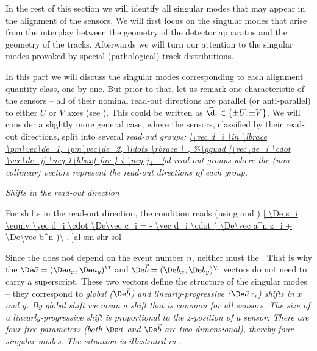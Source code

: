 In the rest of this section we will identify all singular modes that may appear in the alignment of the  sensors. We will first focus on the singular modes that arise from the interplay between the geometry of the detector apparatus and the geometry of the tracks. Afterwards we will turn our attention to the singular modes provoked by special (pathological) track distributions.


In this part we will discuss the singular modes corresponding to each alignment quantity class, one by one. But prior to that, let us remark one characteristic of the  sensors -- all of their nominal read-out directions are parallel (or anti-parallel) to either $U$ or $V$ axes (see ). This could be written as $\vec\d_i \in \{\pm U, \pm V\}$. We will consider a slightly more general case, where the sensors, classified by their read-out directions, split into several \em{read-out groups}:
\eqref{\vec d_i \in \lbrace \pm\vec\de_1, \pm\vec\de_2, \ldots \rbrace \ ,
}{al read-out groups}
where the (non-collinear) vectors represent the read-out directions of each group. 

\baselineskip
\indent\em{Shifts in the read-out direction}

For shifts in the read-out direction, the condition  reads (using  and )
\eqref{
	\De s_i \equiv
	\vec d_i \cdot \De\vec c_i =
	- \vec d_i \cdot ( \De\vec a^n z_i + \De\vec b^n )\ .
}{al sm shr sol}

Since the \lhs{} does not depend on the event number $n$, neither must the \rhs{}. That is why the ${\De\vec a}=(\De a_x, \De a_y)^\T$ and ${\De\vec b=(\De b_x, \De b_y)^\T}$ vectors do not need to carry a superscript. These two vectors define the structure of the singular modes -- they correspond to \em{global} ($\De\vec b$) and \em{linearly-progressive} ($\De\vec a\, z_i$) shifts in $x$ and $y$. By global shift we mean a shift that is common for all sensors. The size of a linearly-progressive shift is proportional to the $z$-position of a sensor. There are four free parameters (both $\De\vec a$ and $\De\vec b$ are two-dimensional), thereby four singular modes. The situation is illustrated in .


